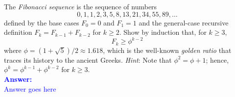 \item{}
The \emph{Fibonacci sequence} is the sequence of numbers
$$0,1,1,2,3,5,8,13,21,34,55,89,\ldots$$
defined by the base cases $F_0=0$ and $F_1=1$ and the general-case recursive
definition $F_k=F_{k-1}+F_{k-2}$ for $k\ge2$. Show by induction that, for $k\ge
3$, $$F_k\ge\phi^{k-2}$$ where $\phi=(1+\sqrt5)/2\approx1.618$, which is the
well-known \emph{golden ratio} that traces its history to the ancient Greeks.
\parend
\emph{Hint}\/: Note that $\phi^2=\phi+1$; hence, $\phi^k=\phi^{k-1}+\phi^{k-2}$
for $k\ge3$.\\[12pt]
\ifanswers
\textcolor{blue}{
\textbf{Answer:}\\[6pt]
Answer goes here
}
\newpage
\fi
